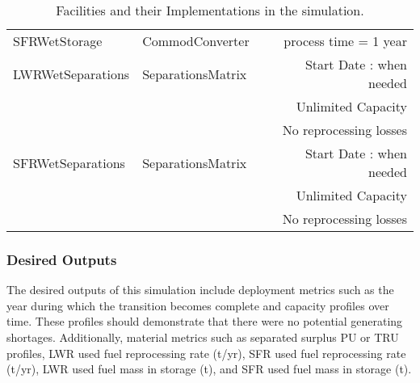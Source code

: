\begin{table}
\begin{tabular}{|l|l|r|}
SFRWetStorage & CommodConverter & process time = 1 year \\
LWRWetSeparations & SeparationsMatrix & Start Date : when needed\\
& & Unlimited Capacity\\
& & No reprocessing losses\\
SFRWetSeparations & SeparationsMatrix & Start Date : when needed\\
& & Unlimited Capacity\\
& & No reprocessing losses\\
\hline
\end{tabular}
\caption{Facilities and their Implementations in the simulation.}
\label{tab:facimpl}
\end{table}
\twocolumn


\subsubsection{Desired Outputs}
The desired outputs of this simulation include deployment metrics such as the 
year during which the transition becomes complete and capacity profiles over 
time. These profiles should demonstrate that there were no potential generating 
shortages. Additionally, material metrics such as separated surplus PU or TRU 
profiles, LWR used fuel reprocessing rate (t/yr), SFR used fuel reprocessing 
rate (t/yr),  LWR used fuel mass in storage (t), and SFR used fuel mass in 
storage (t).
